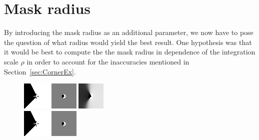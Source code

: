 \section{Mask radius}\label{sec:MaskEx}
By introducing the mask radius as an additional parameter, we now have to pose the question of what
radius would yield the best result. One hypothesis\cite{conversation} was that it would be best to compute the the
mask radius in dependence of the integration scale $\rho$ in order to account for the inaccuracies
mentioned in Section~\ref{sec:CornerEx}. \\
\begin{figure}[h]
    \centering
    \includegraphics[width=0.2\linewidth]{../Images/disctest/flatcorner1.png}\hspace{0.2cm}
    \includegraphics[width=0.2\linewidth]{../Images/disctest/flatcorner1mask.png}\hspace{0.2cm}
    \includegraphics[width=0.2\linewidth]{../Images/disctest/flatcorner1inpaint.png}\\
    \vspace*{0.2cm}
    \includegraphics[width=0.2\linewidth]{../Images/disctest/flatcorner2.png}\hspace{0.2cm}
    \includegraphics[width=0.2\linewidth]{../Images/disctest/flatcorner2mask.png}\hspace{0.2cm}

\end{figure}
